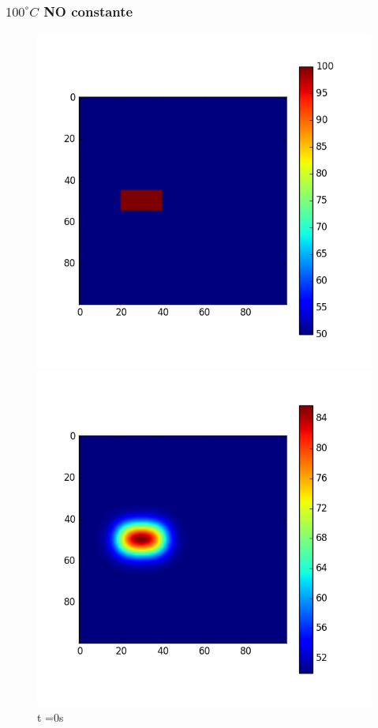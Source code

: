 \documentclass{article}
\begin{document}
\subsubsection{$100^\circ C$ NO constante}
\begin{figure}[H]
  \includegraphics[width=\linewidth]{periodicasNOCte0.png}
  \caption{t =0s}\label{fig:awesome_image1}
\endminipage\hfill
{}
  \includegraphics[width=\linewidth]{periodicasNOCte100.png}

\end{figure}
\end{document}
